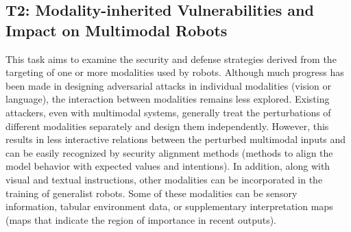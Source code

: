 \subsection{T2: Modality-inherited Vulnerabilities and Impact on Multimodal Robots} \label{sec:t2}
This task aims to examine the security and defense strategies derived from the targeting of one or more modalities used by robots. 
Although much progress has been made in designing adversarial attacks in individual modalities (\eg vision or language), the interaction between modalities remains less explored. Existing attackers, even with multimodal systems, generally treat the perturbations of different modalities separately and design them independently. 
However, this results in less interactive relations between the perturbed multimodal inputs and can be easily recognized by security alignment methods (\ie methods
to align the model behavior with expected values and intentions). 
In addition, along with visual and textual instructions, other modalities can be incorporated in the training of generalist robots. Some of these modalities can be sensory information, tabular environment data, or supplementary interpretation maps (\ie maps that indicate the region of importance in recent outputs). 

